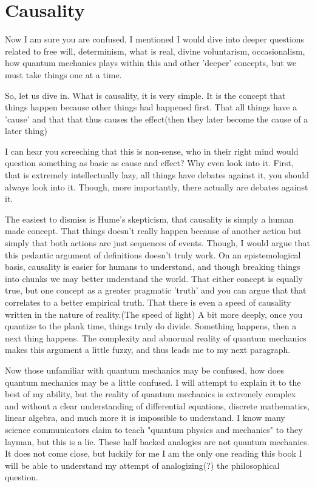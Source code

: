 \section{Causality}
\par Now I am sure you are confused, I mentioned I would dive into deeper questions related to free will, determinism, what is real, divine voluntarism, occasionalism, how quantum mechanics plays within this and other 'deeper' concepts, but we must take things one at a time.
\par So, let us dive in. What is causality, it is very simple. It is the concept that things happen because other things had happened first. That all things  have a 'cause' and that that thus causes the effect(then they later become the cause of a later thing)
\par I can hear you screeching that this is non-sense, who in their right mind would question something as basic as cause and effect? Why even look into it. First, that is extremely intellectually lazy, all things have debates against it, you should always look into it. Though, more importantly, there actually are debates against it.
\par The easiest to dismiss is Hume's skepticism, that causality is simply a human made concept. That things doesn't really happen because of another action but simply that both actions are just sequences of events. Though, I would argue that this pedantic argument of definitions doesn't truly work. On an epistemological basis, causality is easier for humans to understand, and though breaking things into chunks we may better understand the world. That either concept is equally true, but one concept as a greater pragmatic 'truth' and you can argue that that correlates to a better empirical truth. That there is even a speed of causality written in the nature of reality.(The speed of light) A bit more deeply, once you quantize to the plank time, things truly do divide. Something happens, then a next thing happens. The complexity and abnormal reality of quantum mechanics makes this argument a little fuzzy, and thus leads me to my next paragraph.
\par Now those unfamiliar with quantum mechanics may be confused, how does quantum mechanics may be a little confused. I will attempt to explain it to the best of my ability, but the reality of quantum mechanics is extremely complex and without a clear understanding of differential equations, discrete mathematics, linear algebra, and much more it is impossible to understand. I know many science communicators claim to teach "quantum physics and mechanics" to they layman, but this is a lie. These half backed analogies are not quantum mechanics. It does not come close, but luckily for me I am the only one reading this book I will be able to understand my attempt of analogizing(?) the philosophical question.
